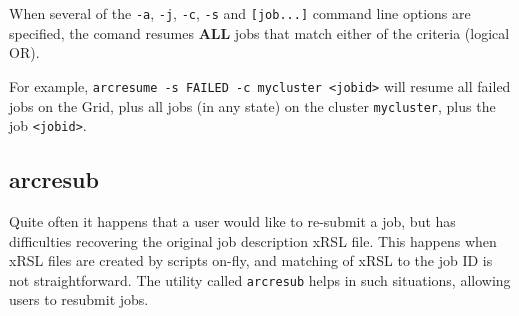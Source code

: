 \begin{framed}
  When several of the \verb#-a#,  \verb#-j#, \verb#-c#, \verb#-s# and \verb#[job...]#
  command line options are specified, the comand resumes \textbf{ALL} jobs that
  match either of the criteria (logical OR).

  For example, \verb#arcresume -s FAILED -c mycluster <jobid># will resume all failed
  jobs on the Grid, plus all jobs (in any state) on the cluster \verb#mycluster#, plus the job \verb#<jobid>#.
\end{framed}


\subsection{arcresub}
\label{sec:arcresub}

Quite often it happens that a user would like to re-submit a job, but
has difficulties recovering the original job description xRSL file.
This happens when xRSL files are created by scripts on-fly, and
matching of xRSL to the job ID is not straightforward. The utility
called \texttt{arcresub} helps
in such situations, allowing users to resubmit jobs.

